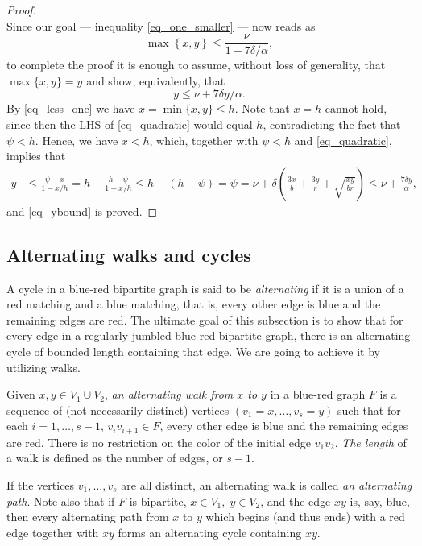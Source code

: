 \documentclass[12pt,reqno]{amsart}
\theoremstyle{definition}
\newcommand{\lhs}{LHS}
\begin{document}
\begin{proof}
\[ \]
Since our goal --- inequality \eqref{eq_one_smaller} --- now reads as
\[
	\max \left\{ x, y \right\} \le \frac{\nu}{1 - 7\delta /\alpha},
\]to complete the proof it is enough to assume, without loss of generality, that $\max \{x, y\} = y$ and show, equivalently, that
\begin{equation}
	y \le \nu + 7\delta y/\alpha.
	\label{eq_ybound}
\end{equation}
By \eqref{eq_less_one} we have $x = \min\{x,y\} \le h$. Note that $x = h$ cannot hold, since then the \lhs{} of \eqref{eq_quadratic} would equal $h$, contradicting the fact that $\psi < h$.
Hence, we have $x < h$, which, together with $\psi < h$ and \eqref{eq_quadratic}, implies that
\begin{align*}
  y &\le \frac{\psi - x}{1 - x/h} = h - \frac{h - \psi}{1 - x/h} \le h - (h - \psi) = \psi = \nu + \delta \left( \frac{3x}b + \frac{3y}r + \sqrt{\frac{xy}{br}} \right) \le \nu + \frac{7\delta y}{\alpha},	
\end{align*}
and \eqref{eq_ybound} is proved. \end{proof}



\subsection{Alternating walks and cycles}
\label{ss_alt_walks_cycle}
A cycle in a blue-red bipartite graph is said to be \emph{alternating} if it is a union of a red matching and a blue matching, that is, every other edge is blue and the remaining edges are red.
The ultimate goal of this subsection is to show that for every edge in a regularly jumbled blue-red bipartite graph, there is an alternating cycle of bounded length containing that edge. We are going to achieve it by utilizing walks.

Given $x,y\in V_1\cup V_2$, \emph{an alternating walk from $x$ to $y$} in a blue-red graph $F$ is a sequence of (not necessarily distinct) vertices $(v_1 = x,\dots,v_s = y)$ such that for each $i = 1,\dots,s-1$, $v_iv_{i+1}\in F$, every other edge is blue and the remaining edges are red. There is no restriction on the color of the initial edge $v_1v_2$. \emph{The length} of a walk is defined as the number of edges, or $s-1$.

If the vertices $v_1,\dots,v_s$ are all distinct, an alternating walk is called \emph{an alternating path}.
Note also that if $F$ is bipartite, $x\in V_1,\;y\in V_2$, and the edge $xy$ is, say, blue, then every alternating path from $x$ to $y$ which begins (and thus ends) with a red edge together with $xy$ forms an alternating cycle containing $xy$.
\end{document}
